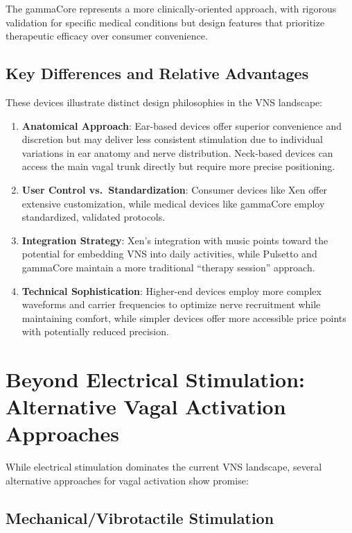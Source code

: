\documentclass[
  Letterpaper,
]{scrbook}
\begin{document}
The gammaCore represents a more clinically-oriented approach, with
rigorous validation for specific medical conditions but design features
that prioritize therapeutic efficacy over consumer convenience.

\subsection{Key Differences and Relative
Advantages}\label{key-differences-and-relative-advantages}

These devices illustrate distinct design philosophies in the VNS
landscape:

\begin{enumerate}
\def\labelenumi{\arabic{enumi}.}
\item
  \textbf{Anatomical Approach}: Ear-based devices offer superior
  convenience and discretion but may deliver less consistent stimulation
  due to individual variations in ear anatomy and nerve distribution.
  Neck-based devices can access the main vagal trunk directly but
  require more precise positioning.
\item
  \textbf{User Control vs.~Standardization}: Consumer devices like Xen
  offer extensive customization, while medical devices like gammaCore
  employ standardized, validated protocols.
\item
  \textbf{Integration Strategy}: Xen's integration with music points
  toward the potential for embedding VNS into daily activities, while
  Pulsetto and gammaCore maintain a more traditional ``therapy session''
  approach.
\item
  \textbf{Technical Sophistication}: Higher-end devices employ more
  complex waveforms and carrier frequencies to optimize nerve
  recruitment while maintaining comfort, while simpler devices offer
  more accessible price points with potentially reduced precision.
\end{enumerate}

\section{Beyond Electrical Stimulation: Alternative Vagal Activation
Approaches}\label{beyond-electrical-stimulation-alternative-vagal-activation-approaches}

While electrical stimulation dominates the current VNS landscape,
several alternative approaches for vagal activation show promise:

\subsection{Mechanical/Vibrotactile
Stimulation}\label{mechanicalvibrotactile-stimulation}
\end{document}
